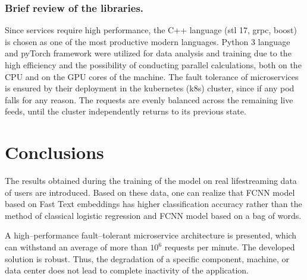 \documentclass[12pt]{jpconf}
\begin{document}
\subsubsection*{Brief review of the libraries.}
Since services require high performance, the C++ language (stl 17, grpc, boost) is chosen as one of the most productive modern languages. Python 3 language and pyTorch framework were utilized for data analysis and training due to the high efficiency and the possibility of conducting parallel calculations, both on the CPU and on the GPU cores of the machine.
The fault tolerance of microservices is ensured by their deployment in the kubernetes (k8s) cluster, since if any pod falls for any reason. The requests are evenly balanced across the remaining live feeds, until the cluster independently returns to its previous state.

\section{Conclusions}
The results obtained during the training of the model on real lifestreaming data of users are introduced. Based on these data, one can realize that FCNN model based on Fast Text embeddings has higher classification accuracy rather than the method of classical logistic regression and FCNN  model based on a bag of words.

A high--performance fault--tolerant microservice architecture is presented, which can withstand an average of more than $10^6$ requests per minute. The developed solution is robust. Thus, the degradation of a specific component, machine, or data center does not lead to complete inactivity of the application.
\end{document}
